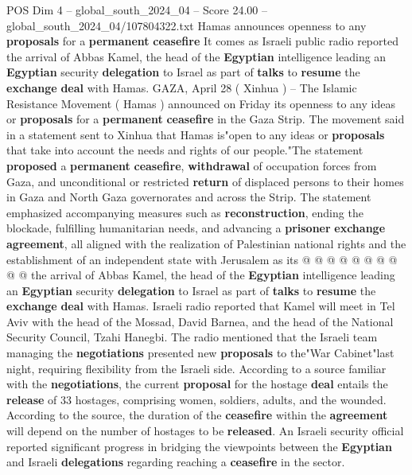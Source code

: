 \begin{textsample}{POS Dim 4 – global\_south\_2024\_04 – Score 24.00 – global\_south\_2024\_04/107804322.txt}  \label{ex:f4_pos_261}
Hamas announces openness to any \textbf{proposals} for a \textbf{permanent} \textbf{ceasefire} It comes as Israeli public radio reported the arrival of Abbas Kamel, the head of the \textbf{Egyptian} intelligence leading an \textbf{Egyptian} security \textbf{delegation} to Israel as part of \textbf{talks} to \textbf{resume} the \textbf{exchange} \textbf{deal} with Hamas.
GAZA, April 28 ( Xinhua ) -- The Islamic Resistance Movement ( Hamas ) announced on Friday its openness to any ideas or \textbf{proposals} for a \textbf{permanent} \textbf{ceasefire} in the Gaza Strip.
The movement said in a statement sent to Xinhua that Hamas is"open to any ideas or \textbf{proposals} that take into account the needs and rights of our people."The statement \textbf{proposed} a \textbf{permanent} \textbf{ceasefire}, \textbf{withdrawal} of occupation forces from Gaza, and unconditional or restricted \textbf{return} of displaced persons to their homes in Gaza and North Gaza governorates and across the Strip.
The statement emphasized accompanying measures such as \textbf{reconstruction}, ending the blockade, fulfilling humanitarian needs, and advancing a \textbf{prisoner} \textbf{exchange} \textbf{agreement}, all aligned with the realization of Palestinian national rights and the establishment of an independent state with Jerusalem as its @ @ @ @ @ @ @ @ @ @ the arrival of Abbas Kamel, the head of the \textbf{Egyptian} intelligence leading an \textbf{Egyptian} security \textbf{delegation} to Israel as part of \textbf{talks} to \textbf{resume} the \textbf{exchange} \textbf{deal} with Hamas.
Israeli radio reported that Kamel will meet in Tel Aviv with the head of the Mossad, David Barnea, and the head of the National Security Council, Tzahi Hanegbi.
The radio mentioned that the Israeli team managing the \textbf{negotiations} presented new \textbf{proposals} to the"War Cabinet"last night, requiring flexibility from the Israeli side.
According to a source familiar with the \textbf{negotiations}, the current \textbf{proposal} for the hostage \textbf{deal} entails the \textbf{release} of 33 hostages, comprising women, soldiers, adults, and the wounded.
According to the source, the duration of the \textbf{ceasefire} within the \textbf{agreement} will depend on the number of hostages to be \textbf{released}.
An Israeli security official reported significant progress in bridging the viewpoints between the \textbf{Egyptian} and Israeli \textbf{delegations} regarding reaching a \textbf{ceasefire} in the sector.

\end{textsample}
